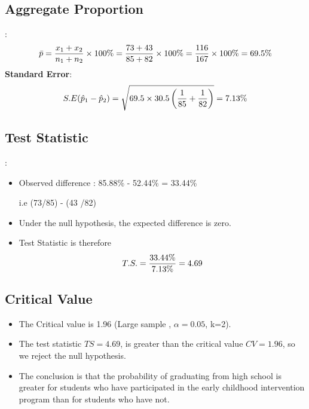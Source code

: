 \documentclass[a4paper,12pt]{article}
\begin{document}





\subsection*{Aggregate Proportion}:\\
\[ \bar{p}  = {x_1  + x_2 \over n_1 + n_2} \times 100\% = {73+43 \over 85 + 82} \times 100\% = { 116 \over 167}\times 100\% = 69.5\% \]
\textbf{Standard Error}:\\
\[ S.E (\hat{p}_1 - \hat{p}_2)  =  \sqrt{69.5 \times 30.5 \left( {1 \over 85} + {1 \over 82}  \right)}  = 7.13\% \]





\subsection*{Test Statistic}:
\begin{itemize} \item Observed difference :
85.88\% - 52.44\%  = 33.44\% \item [ i.e (73/85) - (43 /82) ]
\item Under the null hypothesis, the expected difference is zero.
\item Test Statistic is therefore \[T.S. = {33.44\% \over 7.13\%} = 4.69\]
\end{itemize}



\subsection*{Critical Value}
\begin{itemize}
\item The Critical value is 1.96 (Large sample , $\alpha = 0.05$, k=2).

\item The test statistic $TS = 4.69$, is greater than the critical value $CV = 1.96$, so we reject the null hypothesis.
\item The conclusion is that the probability of graduating from high school is greater for students who have participated in the early childhood intervention program than for students who have not.
\end{itemize}
\end{document}
